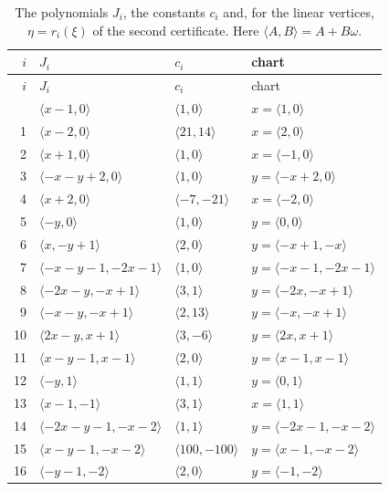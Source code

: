 \documentclass[11pt]{article}
\begin{document}
\begingroup\small
\setlength{\LTcapwidth}{\textwidth}
\begin{longtable}{@{}rlll@{}}
\caption{The polynomials $J_i$, the constants $c_i$ and, for the linear vertices, $\eta=r_i(\xi)$ of the second certificate. Here $\langle A,B\rangle=A+B\omega$.}\label{tab:cvert2}\\
\hline $i$ & $J_i$ & $c_i$ & chart\\\hline\endfirsthead\hline $i$ & $J_i$ & $c_i$ & chart\\\hline\endhead\hline\endfoot
0 & $\langle x-1,0\rangle$ & $\langle 1,0\rangle$ & $x=\langle 1,0\rangle$\\
1 & $\langle x-2,0\rangle$ & $\langle 21,14\rangle$ & $x=\langle 2,0\rangle$\\
2 & $\langle x+1,0\rangle$ & $\langle 1,0\rangle$ & $x=\langle -1,0\rangle$\\
3 & $\langle -x-y+2,0\rangle$ & $\langle 1,0\rangle$ & $y=\langle -x+2,0\rangle$\\
4 & $\langle x+2,0\rangle$ & $\langle -7,-21\rangle$ & $x=\langle -2,0\rangle$\\
5 & $\langle -y,0\rangle$ & $\langle 1,0\rangle$ & $y=\langle 0,0\rangle$\\
6 & $\langle x,-y+1\rangle$ & $\langle 2,0\rangle$ & $y=\langle -x+1,-x\rangle$\\
7 & $\langle -x-y-1,-2x-1\rangle$ & $\langle 1,0\rangle$ & $y=\langle -x-1,-2x-1\rangle$\\
8 & $\langle -2x-y,-x+1\rangle$ & $\langle 3,1\rangle$ & $y=\langle -2x,-x+1\rangle$\\
9 & $\langle -x-y,-x+1\rangle$ & $\langle 2,13\rangle$ & $y=\langle -x,-x+1\rangle$\\
10 & $\langle 2x-y,x+1\rangle$ & $\langle 3,-6\rangle$ & $y=\langle 2x,x+1\rangle$\\
11 & $\langle x-y-1,x-1\rangle$ & $\langle 2,0\rangle$ & $y=\langle x-1,x-1\rangle$\\
12 & $\langle -y,1\rangle$ & $\langle 1,1\rangle$ & $y=\langle 0,1\rangle$\\
13 & $\langle x-1,-1\rangle$ & $\langle 3,1\rangle$ & $x=\langle 1,1\rangle$\\
14 & $\langle -2x-y-1,-x-2\rangle$ & $\langle 1,1\rangle$ & $y=\langle -2x-1,-x-2\rangle$\\
15 & $\langle x-y-1,-x-2\rangle$ & $\langle 100,-100\rangle$ & $y=\langle x-1,-x-2\rangle$\\
16 & $\langle -y-1,-2\rangle$ & $\langle 2,0\rangle$ & $y=\langle -1,-2\rangle$\\

\end{longtable}
\end{document}

